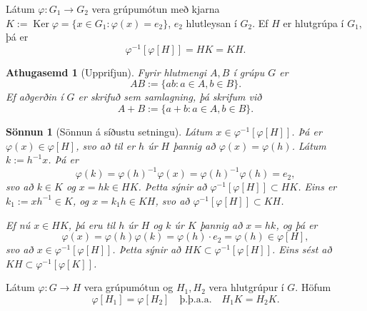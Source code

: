 \documentclass[a4paper,icelandic,11pt]{book}
\theoremstyle{plain}
\newtheorem*{ath}{Athugasemd}
\newtheorem*{sonnun}{Sönnun}
\DeclareMathOperator{\Ker}{Ker} %
\begin{document}
\begin{setn}
  Látum $\varphi:G_1\to G_2$ vera grúpumótun með kjarna $K:= \Ker \varphi =
  \{x\in G_1:\varphi(x) = e_2 \}$, $e_2$ hlutleysan í $G_2$. Ef $H$ er hlutgrúpa
  í $G_1$, þá er
  \[
    \varphi^{-1}[\varphi[H]] = HK = KH.
  \]
\end{setn}
\begin{ath}[Upprifjun]
  Fyrir hlutmengi $A,B$ í grúpu $G$ er \[
    AB := \{ ab: a\in A, b\in B\}.
  \]
  Ef aðgerðin í $G$ er skrifuð sem samlagning, þá skrifum við \[
    A+B := \{ a+b: a\in A, b\in B \}.
  \]
\end{ath}
\begin{sonnun}[Sönnun á síðustu setningu]
  Látum $x\in \varphi^{-1}[\varphi[H]]$. Þá er $\varphi(x)\in \varphi[H]$, svo
  að til er $h$ úr $H$ þannig að $\varphi(x) = \varphi(h)$. Látum $k :=
  h^{-1}x$. Þá er \[
  \varphi(k) 
  = \varphi(h)^{-1}\varphi(x)
  = \varphi(h)^{-1}\varphi(h) 
  = e_2,
  \]
  svo að $k\in K$ og $x = hk\in HK$. Þetta sýnir að
  $\varphi^{-1}[\varphi[H]]\subset HK$. Eins er $k_1 := xh^{-1}\in K$, og $x =
  k_1 h \in KH$, svo að $\varphi^{-1}[\varphi[H]]\subset KH$.
  
  Ef nú $x\in HK$, þá eru til $h$ úr $H$ og $k$ úr $K$ þannig að $x = hk$, og þá
  er \[
  \varphi(x)
  = \varphi(h)\varphi(k)
  =\varphi(h)\cdot e_2
  = \varphi(h)
  \in\varphi[H],
  \]
  svo að $x\in \varphi^{-1}[\varphi[H]]$. Þetta sýnir að $HK\subset
  \varphi^{-1}[\varphi[H]]$. Eins sést að $KH\subset \varphi^{-1}[\varphi[K]]$.
\end{sonnun}

\begin{fylgisetn}\label{cor:grupum}
  Látum $\varphi: G\to H$ vera grúpumótun og $H_1, H_2$ vera hlutgrúpur í $G$. Höfum \[
    \varphi[H_1] = \varphi[H_2] \quad \text{þ.þ.a.a.} \quad H_1 K = H_2 K.
  \]
\end{fylgisetn}
\end{document}
